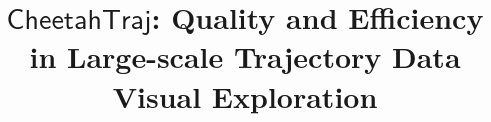 \documentclass[sigconf,authordraft,review]{acmart}
\newcommand{\avats}{\mathsf{CheetahTraj}}
\begin{document}
\title{$\avats$: Quality and Efficiency in Large-scale Trajectory Data Visual Exploration}





\end{document}
